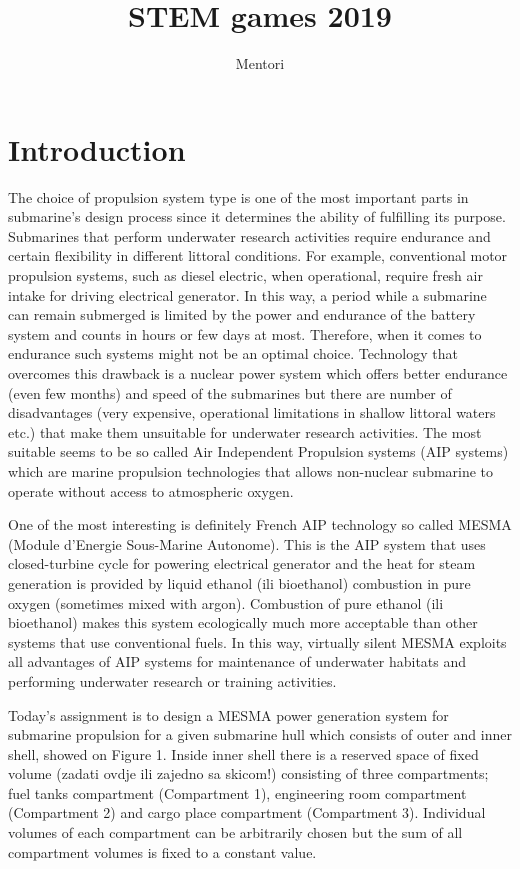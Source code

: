 \documentclass{article}
\title{STEM games 2019}
\author{Mentori}
\begin{document}
	
	\maketitle
	
	
	
	\section{Introduction}
	
	The choice of propulsion system type is one of the most important parts in submarine’s design process since it determines the ability of fulfilling its purpose. Submarines that perform underwater research activities require endurance and certain flexibility in different littoral conditions. For example, conventional motor propulsion systems, such as diesel electric, when operational, require fresh air intake for driving electrical generator. In this way, a period while a submarine can remain submerged is limited by the power and endurance of the battery system and counts in hours or few days at most. Therefore, when it comes to endurance such systems might not be an optimal choice. Technology that overcomes this drawback is a nuclear power system which offers better endurance (even few months) and speed of the submarines but there are number of disadvantages (very expensive, operational limitations in shallow littoral waters etc.) that make them unsuitable for underwater research activities. The most suitable seems to be so called Air Independent Propulsion systems (AIP systems) which are marine propulsion technologies that allows non-nuclear submarine to operate without access to atmospheric oxygen. 
	
	One of the most interesting is definitely French AIP technology so called MESMA (Module d'Energie Sous-Marine Autonome). This is the AIP system that uses closed-turbine cycle for powering electrical generator and the heat for steam generation is provided by liquid ethanol (ili bioethanol) combustion in pure oxygen (sometimes mixed with argon). Combustion of pure ethanol (ili bioethanol) makes this system ecologically much more acceptable than other systems that use conventional fuels. In this way, virtually silent MESMA exploits all advantages of AIP systems for maintenance of underwater habitats and performing underwater research or training activities.
	 
	Today's assignment is to design a MESMA power generation system for submarine propulsion for a given submarine hull which consists of outer and inner shell, showed on Figure 1. Inside inner shell there is a reserved space of fixed volume (zadati ovdje ili zajedno sa skicom!) consisting of three compartments; fuel tanks compartment (Compartment 1), engineering room compartment (Compartment 2) and cargo place compartment (Compartment 3). Individual volumes of each compartment can be arbitrarily chosen but the sum of all compartment volumes is fixed to a constant value. 
	
\end{document}
